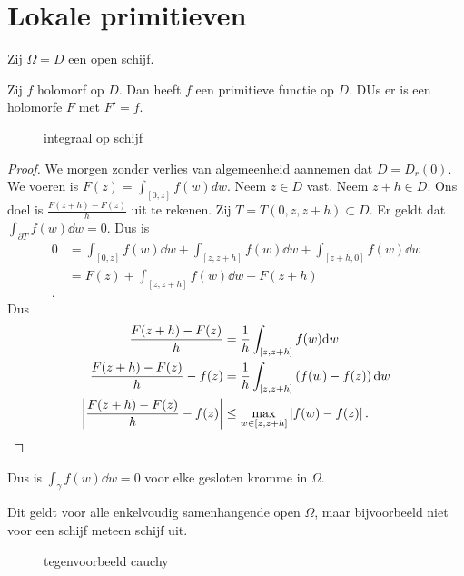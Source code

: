 \section{Lokale primitieven} \label{sec:lokale_primitieven}
Zij $\Omega = D$ een  open schijf.
\begin{stelling}
	Zij $f$ holomorf op $D$. Dan heeft $f$ een primitieve functie op $D$. DUs er is een holomorfe $F$ met $F' = f$. 
\end{stelling}
\begin{figure}[ht]
    \centering
    \caption{integraal op schijf}
    \label{fig:integraal-op-schijf}
\end{figure}
\begin{proof}
	We morgen zonder verlies van algemeenheid aannemen dat $D = D_{r}(0)$. 
	We voeren is $F(z) = \int_{[0,z]} f(w) dw$. 
	Neem $z \in D$ vast. Neem $z + h \in D$. Ons doel is $\frac{F(z + h) - F(z)}{h}$ uit te rekenen. 
	Zij $T = T(0, z, z+ h)\subset  D$. 
	Er geldt dat $\int_{\partial T} f(w) \dd w = 0$. 
	Dus is 
	\begin{align*}
		0 &=  \int_{[0, z]} f(w) \dd w + \int_{[z, z + h]} f(w) \dd w + \int_{[z + h, 0]} f(w) \dd w  \\
		  &=  F(z) + \int_{[z, z + h]} f(w) \dd w - F(z + h) \\
	.\end{align*}
	Dus 
	\begin{align*}
		\frac{F(z+ h) - F(z)}{h} &= \frac{1}{h} \int_{[z, z + h]} f(w) \mathrm{d} w \\
		\frac{F(z + h) - F(z)}{h} - f(z) &= \frac{1}{h} \int_{[z, z+ h]} \left( f(w) - f(z) \right) \mathrm{d} w\\
		\left| \frac{F(z + h) - F(z)}{h} - f(z)  \right| &\le \max_{w \in [z, z + h]} \left| f(w) - f(z) \right|
	.\end{align*}
\end{proof}
\begin{gevolg}
	Dus is $\int_{\gamma} f(w) \dd w = 0$ voor elke gesloten kromme in $\Omega$. 	
\end{gevolg}
\begin{opmerking}
	Dit geldt voor alle enkelvoudig samenhangende open  $\Omega$, maar bijvoorbeeld niet voor een schijf meteen schijf uit. 
\end{opmerking}
\begin{figure}[ht]
    \centering
    \caption{tegenvoorbeeld cauchy}
    \label{fig:tegenvoorbeeld-cauchy}
\end{figure}

